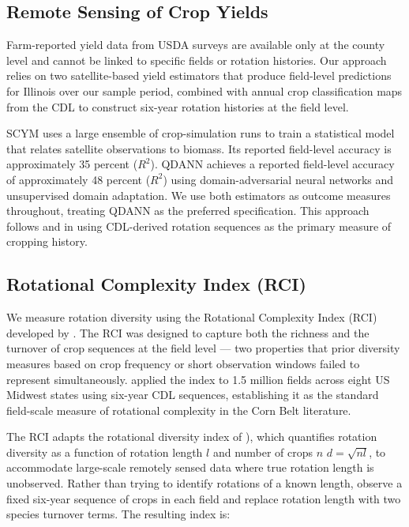 \documentclass[12pt,letterpaper]{article}
\theoremstyle{remark}
\theoremstyle{plain}
\theoremstyle{definition}
\begin{document}
\subsection{\label{subsec:remote_sensing}Remote Sensing of Crop Yields}

Farm-reported yield data from USDA surveys are available only at the county level and cannot be linked to specific fields or rotation histories. Our approach relies on two satellite-based yield estimators that produce field-level predictions for Illinois over our sample period, combined with annual crop classification maps from the CDL to construct six-year rotation histories at the field level.

SCYM \citep{lobell2015} uses a large ensemble of crop-simulation runs to train a statistical model that relates satellite observations to biomass. Its reported field-level accuracy is approximately 35 percent ($R^2$). QDANN \citep{Ma2024} achieves a reported field-level accuracy of approximately 48 percent ($R^2$) using domain-adversarial neural networks and unsupervised domain adaptation. We use both estimators as outcome measures throughout, treating QDANN as the preferred specification. This approach follows \citet{Pates2025} and \citet{socolar2021} in using CDL-derived rotation sequences as the primary measure of cropping history.
    
\subsection{\label{subsec:rci}Rotational Complexity Index (RCI)}	
We measure rotation diversity using the Rotational Complexity Index (RCI) developed by \cite{socolar2021}. The RCI was designed to capture both the richness and the turnover of crop sequences at the field level — two properties that prior diversity measures based on crop frequency or short observation windows failed to represent simultaneously. \cite{socolar2021} applied the index to 1.5 million fields across eight US Midwest states using six-year CDL sequences, establishing it as the standard field-scale measure of rotational complexity in the Corn Belt literature.

The RCI adapts the rotational diversity index of \cite{Tiemann2016}), which quantifies rotation diversity as a function of rotation length $l$ and number of crops $n$ $d = \sqrt{nl}$, to accommodate large-scale remotely sensed data where true rotation length is unobserved. Rather than trying to identify rotations of a known length, \cite{socolar2021} observe a fixed six-year sequence of crops in each field and replace rotation length with two species turnover terms. The resulting index is:
\end{document}
